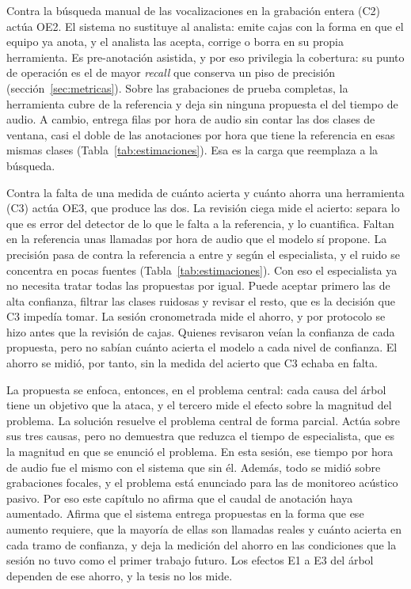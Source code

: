 Contra la búsqueda manual de las vocalizaciones en la grabación entera
(C2) actúa OE2. El sistema no sustituye al analista: emite cajas con la forma en
que el equipo ya anota, y el analista las acepta, corrige o borra en su propia
herramienta. Es pre-anotación asistida, y por eso privilegia la cobertura: su
punto de operación es el de mayor \textit{recall} que conserva un piso de
precisión (sección~\ref{sec:metricas}). Sobre las grabaciones de prueba
completas, la herramienta cubre \uRecallRows{} de la referencia y deja sin
ninguna propuesta el \uAudioWithoutProposals{} del tiempo de audio. A cambio,
entrega \uProposalsPerHourBox{} filas por hora de audio sin contar las dos clases
de ventana, casi el doble de las \uRefPerHour{} anotaciones por hora que tiene la
referencia en esas mismas clases
(Tabla~\ref{tab:estimaciones}). Esa es la carga que reemplaza a la búsqueda.

Contra la falta de una medida de cuánto acierta y cuánto ahorra una herramienta
(C3) actúa OE3, que produce las dos. La revisión ciega mide el acierto: separa lo
que es error del detector de lo que le falta a la referencia, y lo cuantifica. Faltan en la referencia unas \uUnannotatedPerHour{}
llamadas por hora de audio que el modelo sí propone. La precisión pasa de
\uPrecisionRef{} contra la referencia a entre \uPrecisionStrict{} y
\uPrecisionLenient{} según el especialista, y el ruido se concentra en pocas
fuentes (Tabla~\ref{tab:estimaciones}). Con eso el especialista ya no necesita tratar todas las propuestas por
igual. Puede aceptar primero las de alta confianza, filtrar las clases ruidosas y
revisar el resto, que es la decisión que C3 impedía tomar. La sesión
cronometrada mide el ahorro, y por protocolo se hizo antes que la revisión de
cajas. Quienes revisaron veían la confianza de cada propuesta, pero no sabían
cuánto acierta el modelo a cada nivel de confianza. El ahorro se midió, por
tanto, sin la medida del acierto que C3 echaba en falta.

La propuesta se enfoca, entonces, en el problema central: cada causa del árbol
tiene un objetivo que la ataca, y el tercero mide el efecto sobre la magnitud del
problema. La solución resuelve el problema central de forma parcial.
Actúa sobre sus tres causas, pero no demuestra que reduzca el tiempo de
especialista, que es la magnitud en que se enunció el problema. En esta sesión,
ese tiempo por hora de audio fue el mismo con el sistema que sin él. Además, todo
se midió sobre grabaciones focales, y el problema está enunciado para las de
monitoreo acústico pasivo. Por eso
este capítulo no afirma que el caudal de anotación haya aumentado. Afirma que el
sistema entrega propuestas en la forma que ese aumento requiere, que la mayoría
de ellas son llamadas reales y cuánto acierta en cada tramo de confianza, y
deja la medición del ahorro en las condiciones que la sesión no tuvo como el
primer trabajo futuro. Los efectos E1 a E3 del árbol dependen de ese ahorro, y
la tesis no los mide.

